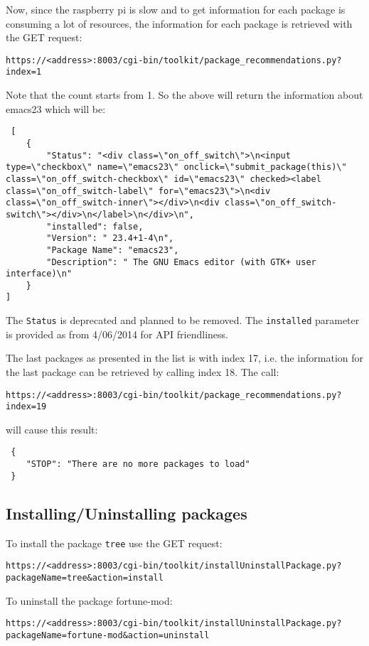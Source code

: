 \documentclass[12pt]{article}
\begin{document}
  Now, since the raspberry pi is slow and to get information for each package is consuming a lot of resources, the information for each package is retrieved with the GET request:
 
 
 \texttt{https://<address>:8003/cgi-bin/toolkit/package\_recommendations.py?index=1} 

Note that the count starts from 1. So the above will return the information about emacs23 which will be:
 
 \begin{verbatim}
 [
    {
        "Status": "<div class=\"on_off_switch\">\n<input type=\"checkbox\" name=\"emacs23\" onclick=\"submit_package(this)\" class=\"on_off_switch-checkbox\" id=\"emacs23\" checked><label class=\"on_off_switch-label\" for=\"emacs23\">\n<div class=\"on_off_switch-inner\"></div>\n<div class=\"on_off_switch-switch\"></div>\n</label>\n</div>\n",
        "installed": false,
        "Version": " 23.4+1-4\n",
        "Package Name": "emacs23",
        "Description": " The GNU Emacs editor (with GTK+ user interface)\n"
    }
]
 \end{verbatim}
 
 The \texttt{Status} is deprecated and planned to be removed. The \texttt{installed} parameter is provided as from 4/06/2014 for API friendliness.
 
 The last packages as presented in the list is with index 17, i.e. the information for the last package can be retrieved by calling index 18. The call:
 
 
 \texttt{https://<address>:8003/cgi-bin/toolkit/package\_recommendations.py?index=19}
 
 will cause this result:
 
 \begin{verbatim}
 {
    "STOP": "There are no more packages to load"
 }
 \end{verbatim}
 
 \subsection{Installing/Uninstalling packages}
 To install the package \texttt{tree} use the GET request:

 \texttt{https://<address>:8003/cgi-bin/toolkit/installUninstallPackage.py?\\
 packageName=tree\&action=install}
 
 To uninstall the package fortune-mod:
 
 
 \texttt{https://<address>:8003/cgi-bin/toolkit/installUninstallPackage.py?\\
 packageName=fortune-mod\&action=uninstall}
 
\end{document}
